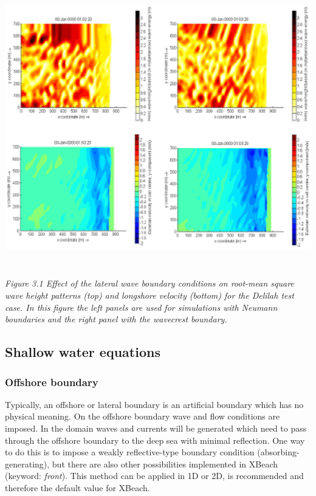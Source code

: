 \documentclass{article}
\begin{document}
\noindent \includegraphics*[width=5.86in, height=4.78in, keepaspectratio=false, trim=0.11in 0.00in 0.06in 0.00in]{image23}

\noindent \textit{Figure 3.1 Effect of the lateral wave boundary conditions on root-mean square wave height patterns (top) and longshore velocity (bottom) for the Delilah test case.  In this figure the left panels are used for simulations with Neumann boundaries and the right panel with the wavecrest boundary. }


\subsection{ Shallow water equations}


\subsubsection{ Offshore boundary}

\noindent Typically, an offshore or lateral boundary is an artificial boundary which has no physical meaning. On the offshore boundary wave and flow conditions are imposed. In the domain waves and currents will be generated which need to pass through the offshore boundary to the deep sea with minimal reflection. One way to do this is to impose a weakly reflective-type boundary condition (absorbing-generating), but there are also other possibilities implemented in XBeach (keyword: \textit{front}). This method can be applied in 1D or 2D, is recommended and therefore the default value for XBeach.
\end{document}
